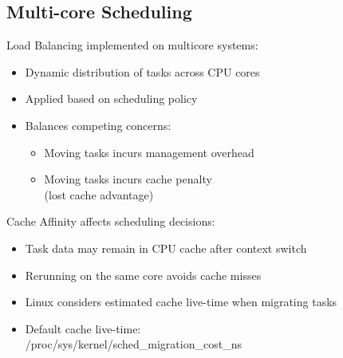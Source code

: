 \multend

\subsection{Multi-core Scheduling}


\begin{definition}{Load Balancing} implemented on multicore systems:
    \begin{itemize}
        \item Dynamic distribution of tasks across CPU cores
        \item Applied based on scheduling policy
        \item Balances competing concerns:
            \begin{itemize}
                \item Moving tasks incurs management overhead
                \item Moving tasks incurs cache penalty \\ (lost cache advantage)
            \end{itemize}
    \end{itemize}
\end{definition}

\begin{definition}{Cache Affinity} affects scheduling decisions:
    \begin{itemize}
        \item Task data may remain in CPU cache after context switch
        \item Rerunning on the same core avoids cache misses
        \item Linux considers estimated cache live-time when migrating tasks
        \item Default cache live-time: \\ /proc/sys/kernel/sched\_migration\_cost\_ns
    \end{itemize}
\end{definition}

\multend

